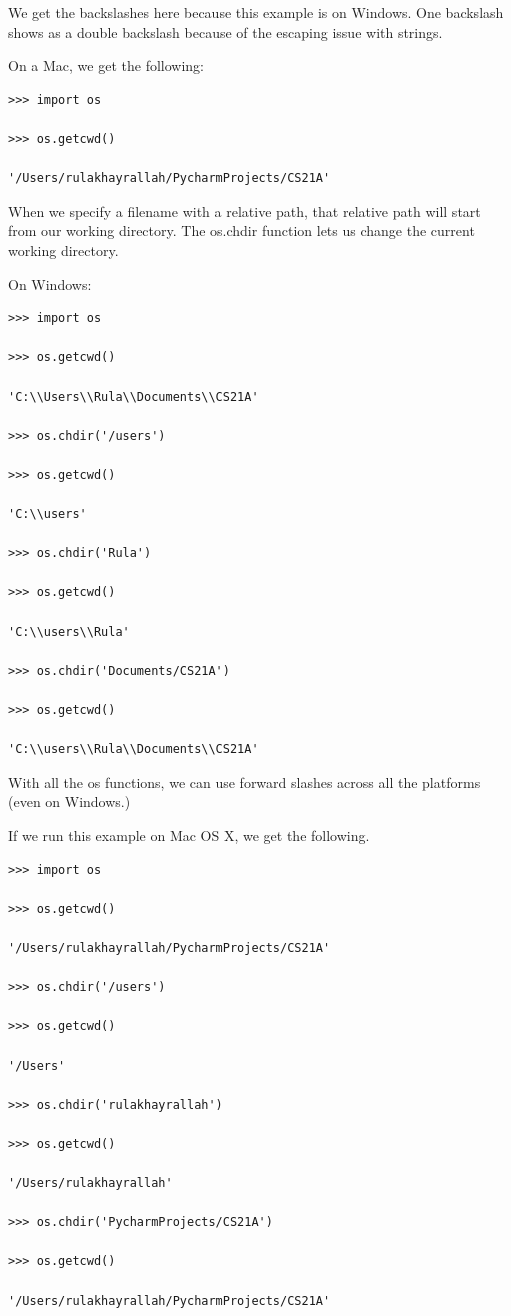 \documentclass{article}
\begin{document}
We get the backslashes here because this example is on Windows.   One backslash shows as a double backslash because of the escaping issue with strings.

On a Mac, we get the following:

\begin{lstlisting}
>>> import os

>>> os.getcwd()

'/Users/rulakhayrallah/PycharmProjects/CS21A'
\end{lstlisting}

When we specify a filename with a relative path,  that relative path will start from our working directory.  The os.chdir function lets us change the current working directory.

On Windows:

\begin{lstlisting}
>>> import os

>>> os.getcwd()

'C:\\Users\\Rula\\Documents\\CS21A'

>>> os.chdir('/users')

>>> os.getcwd()

'C:\\users'

>>> os.chdir('Rula')

>>> os.getcwd()

'C:\\users\\Rula'

>>> os.chdir('Documents/CS21A')

>>> os.getcwd()

'C:\\users\\Rula\\Documents\\CS21A'
\end{lstlisting}

With all the os functions, we can use forward slashes across all the platforms (even on Windows.)

If we run this example on Mac OS X, we get the following. 

\begin{lstlisting}
>>> import os

>>> os.getcwd()

'/Users/rulakhayrallah/PycharmProjects/CS21A'

>>> os.chdir('/users')

>>> os.getcwd()

'/Users'

>>> os.chdir('rulakhayrallah')

>>> os.getcwd()

'/Users/rulakhayrallah'

>>> os.chdir('PycharmProjects/CS21A')

>>> os.getcwd()

'/Users/rulakhayrallah/PycharmProjects/CS21A'
\end{lstlisting}
\end{document}
